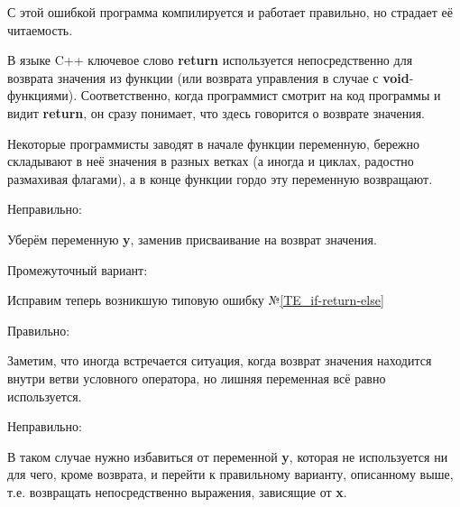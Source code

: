 \begin{typerror}
	\label{TE_variable-only-for-return}

	С этой ошибкой программа компилируется и работает правильно,
	но страдает её читаемость.

	В языке C++ ключевое слово \textbf{return} используется непосредственно для возврата значения из функции
	(или возврата управления в случае с \textbf{void}-функциями).
	Соответственно, когда программист смотрит на код программы и видит \textbf{return},
	он сразу понимает, что здесь говорится о возврате значения.

	Некоторые программисты заводят в начале функции переменную,
	бережно складывают в неё значения в разных ветках
	(а иногда и циклах, радостно размахивая флагами),
	а в конце функции гордо эту переменную возвращают.

	Неправильно:

	Уберём переменную \textbf{y}, заменив присваивание на возврат значения.

	Промежуточный вариант:

	Исправим теперь возникшую типовую ошибку №\ref{TE_if-return-else}

	Правильно:

	Заметим, что иногда встречается ситуация, когда возврат значения находится внутри ветви условного оператора,
	но лишняя переменная всё равно используется.

	Неправильно:

	В таком случае нужно избавиться от переменной \textbf{y},
	которая не используется ни для чего, кроме возврата,
	и перейти к правильному варианту, описанному выше,
	т.е. возвращать непосредственно выражения, зависящие от \textbf{x}.

\end{typerror}
